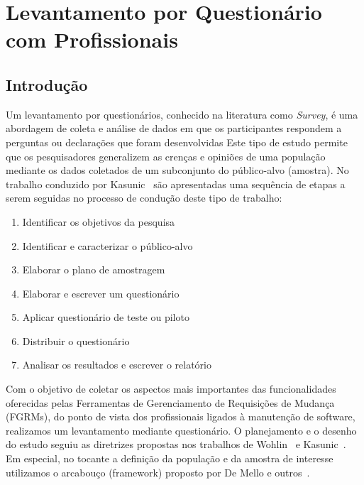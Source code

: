 \chapter{Levantamento por Questionário com Profissionais}
\label{ch:pesquisa-profissionais}

\section{Introdução}
\label{sec:pesquisa-profissionais-intro}

Um levantamento por questionários, conhecido na literatura como
\textit{Survey}, é uma abordagem de coleta e análise de dados em que os
participantes respondem a perguntas ou declarações que foram desenvolvidas
Este tipo de estudo permite que os pesquisadores generalizem as crenças e
opiniões de uma população mediante os dados coletados de um subconjunto do
público-alvo (amostra). No trabalho conduzido por
Kasunic~\cite{kasunic2005designing} são apresentadas uma sequência de etapas a
serem seguidas no processo de condução deste tipo de trabalho:

\begin{enumerate}
\item{Identificar os objetivos da pesquisa}
\item{Identificar e caracterizar o público-alvo}
\item{Elaborar o plano de amostragem}
\item{Elaborar e escrever um questionário}
\item{Aplicar questionário de teste ou piloto}
\item{Distribuir o questionário}
\item{Analisar os resultados e escrever o relatório}
\end{enumerate}

Com o objetivo de coletar os aspectos mais importantes das funcionalidades
oferecidas pelas Ferramentas de Gerenciamento de Requisições de Mudança (FGRMs),
do ponto de vista dos profissionais ligados à manutenção de software, realizamos
um levantamento mediante questionário. O planejamento e o desenho do estudo
seguiu as diretrizes propostas nos trabalhos de
Wohlin~\cite{wohlin2012experimentation} e Kasunic~\cite{kasunic2005designing}.
Em especial, no tocante a definição da população e da amostra de interesse
utilizamos o arcabouço (framework) proposto por De Mello e
outros~\cite{de2015investigating, de2014towards}.

